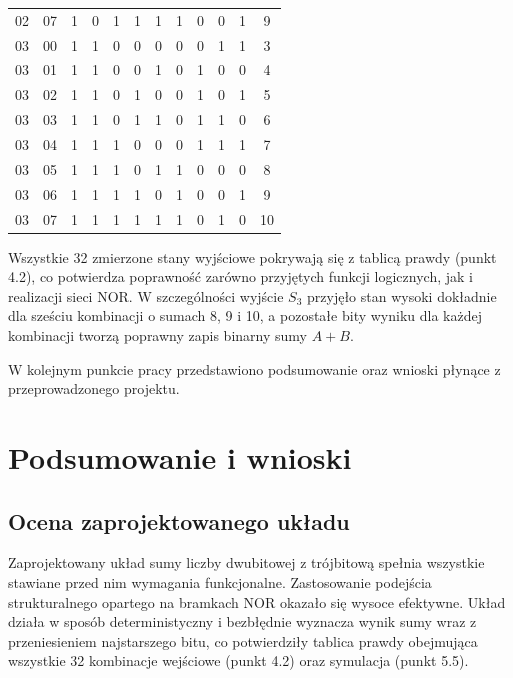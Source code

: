 \documentclass[11pt]{article}
\begin{document}
\begin{table}[H]
\begin{tabular}{cc|ccccc|cccc|c}
02 & 07 & 1 & 0 & 1 & 1 & 1 & 1 & 0 & 0 & 1 & 9 \\
03 & 00 & 1 & 1 & 0 & 0 & 0 & 0 & 0 & 1 & 1 & 3 \\
03 & 01 & 1 & 1 & 0 & 0 & 1 & 0 & 1 & 0 & 0 & 4 \\
03 & 02 & 1 & 1 & 0 & 1 & 0 & 0 & 1 & 0 & 1 & 5 \\
03 & 03 & 1 & 1 & 0 & 1 & 1 & 0 & 1 & 1 & 0 & 6 \\
03 & 04 & 1 & 1 & 1 & 0 & 0 & 0 & 1 & 1 & 1 & 7 \\
03 & 05 & 1 & 1 & 1 & 0 & 1 & 1 & 0 & 0 & 0 & 8 \\
03 & 06 & 1 & 1 & 1 & 1 & 0 & 1 & 0 & 0 & 1 & 9 \\
03 & 07 & 1 & 1 & 1 & 1 & 1 & 1 & 0 & 1 & 0 & 10 \\
\hline
\end{tabular}
\end{table}

Wszystkie 32 zmierzone stany wyjściowe pokrywają się z tablicą prawdy (punkt 4.2), co potwierdza poprawność zarówno przyjętych funkcji logicznych, jak i realizacji sieci NOR. W szczególności wyjście \(S_3\) przyjęło stan wysoki dokładnie dla sześciu kombinacji o sumach 8, 9 i 10, a pozostałe bity wyniku dla każdej kombinacji tworzą poprawny zapis binarny sumy \(A+B\).

W kolejnym punkcie pracy przedstawiono podsumowanie oraz wnioski płynące z przeprowadzonego projektu.

\section{Podsumowanie i wnioski}

\subsection{Ocena zaprojektowanego układu}

Zaprojektowany układ sumy liczby dwubitowej z trójbitową spełnia wszystkie stawiane przed nim wymagania funkcjonalne. Zastosowanie podejścia strukturalnego opartego na bramkach NOR okazało się wysoce efektywne. Układ działa w sposób deterministyczny i bezbłędnie wyznacza wynik sumy wraz z przeniesieniem najstarszego bitu, co potwierdziły tablica prawdy obejmująca wszystkie 32 kombinacje wejściowe (punkt 4.2) oraz symulacja (punkt 5.5).
\end{document}
